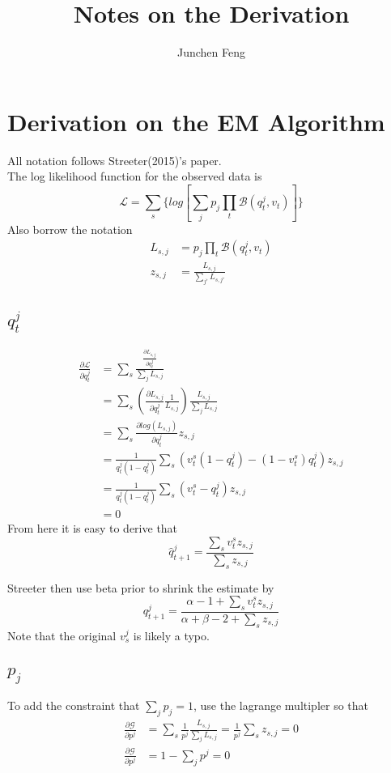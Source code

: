 \documentclass{article}
\title{Notes on the Derivation}
\author{Junchen Feng}
\begin{document}
\maketitle

\section{Derivation on the EM Algorithm}
All notation follows Streeter(2015)'s paper.\\
The log likelihood function for the observed data is \[
\mathcal{L} = \sum_{s}\{log[\sum_{j}p_j\prod_{t}\mathcal{B}(q_t^j, v_t)]\}
\]
Also borrow the notation
\begin{align*}
L_{s,j} &= p_j\prod_{t}\mathcal{B}(q_t^j, v_t) \\
z_{s,j} &= \frac{L_{s,j}}{\sum_{j'} L_{s,j'}}
\end{align*}


\subsection{$q_t^j$}
\begin{align*}
\frac{\partial \mathcal{L} }{\partial q_t^j} &=  \sum_{s} \frac{\frac{\partial L_{s,j}}{\partial q_t^j}}{\sum_{j}L_{s,j}}\\
&= \sum_{s} (\frac{\partial L_{s,j}}{\partial q_t^j}\frac{1}{L_{s,j}})\frac{L_{s,j}}{\sum_{j}L_{s,j}}\\
&= \sum_{s} \frac{\partial log(L_{s,j})}{\partial q_t^j} z_{s,j}\\
&= \frac{1}{q_t^j(1-q_t^j)}\sum_{s} (v_t^s(1-q_t^j)-(1-v_t^s)q_t^j)z_{s,j}\\
&= \frac{1}{q_t^j(1-q_t^j)}\sum_{s} (v_t^s-q_t^j)z_{s,j}\\
&=0
\end{align*}
From here it is easy to derive that
\[
\hat{q}_{t+1}^j = \frac{\sum_{s}v_t^sz_{s,j}}{\sum_{s}z_{s,j}}
\]

Streeter then use beta prior to shrink the estimate by
\[
q_{t+1}^j = \frac{\alpha-1+\sum_{s}v_t^sz_{s,j}}{\alpha+\beta-2+\sum_{s}z_{s,j}}
\]
Note that the original $v_s^j$ is likely a typo.

\subsection{$p_j$}
To add the constraint that $\sum_{j}p_j = 1$, use the lagrange multipler so that 
\begin{align*}
\frac{\partial \mathcal{G} }{\partial p^j} &=  \sum_{s} \frac{1}{p^j}\frac{L_{s,j}}{\sum_{j}L_{s,j}} =  \frac{1}{p^j} \sum_{s} z_{s,j} = 0\\
\frac{\partial \mathcal{G} }{\partial p^j} &= 1 - \sum_{j}p^j = 0
\end{align*}
\end{document}

